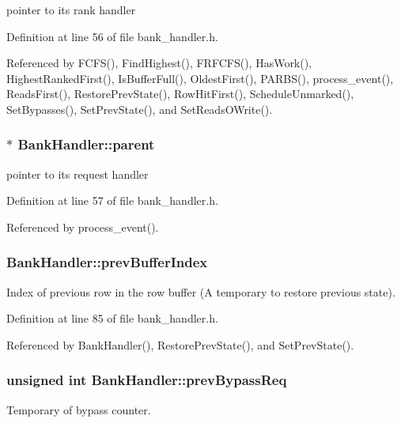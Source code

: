 pointer to its rank handler 



Definition at line 56 of file bank\_\-handler.h.

Referenced by FCFS(), FindHighest(), FRFCFS(), HasWork(), HighestRankedFirst(), IsBufferFull(), OldestFirst(), PARBS(), process\_\-event(), ReadsFirst(), RestorePrevState(), RowHitFirst(), ScheduleUnmarked(), SetBypasses(), SetPrevState(), and SetReadsOWrite().
\subsubsection[{parent}]{$\ast$ {\bf BankHandler::parent}}\label{classBankHandler_6c12437f421478ba8df1a0b45de47844}


pointer to its request handler 



Definition at line 57 of file bank\_\-handler.h.

Referenced by process\_\-event().
\subsubsection[{prevBufferIndex}]{ {\bf BankHandler::prevBufferIndex}}\label{classBankHandler_0ceaaf43fc1f868c17c3a7234b999d6b}


Index of previous row in the row buffer (A temporary to restore previous state). 



Definition at line 85 of file bank\_\-handler.h.

Referenced by BankHandler(), RestorePrevState(), and SetPrevState().
\subsubsection[{prevBypassReq}]{\setlength{\rightskip}{0pt plus 5cm}unsigned int {\bf BankHandler::prevBypassReq}}\label{classBankHandler_1f79e0941b32431cdea572d7f43bd26a}


Temporary of bypass counter. 



